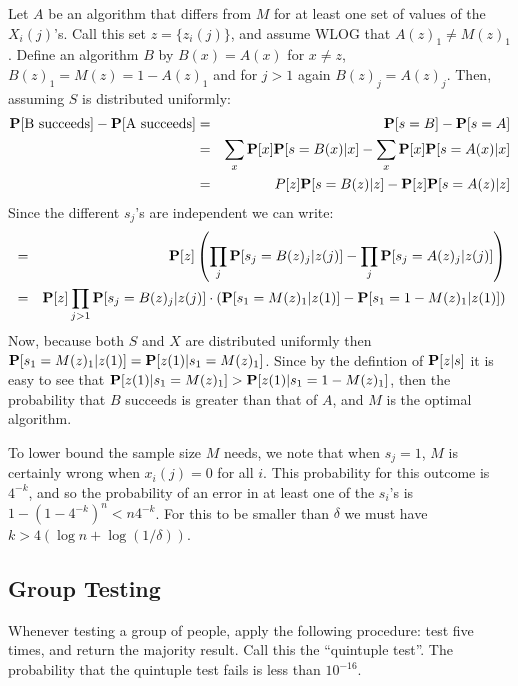 \documentclass[11pt]{article} \usepackage{amssymb}
\begin{document}
\begin{itemize}
Let $A$ be an algorithm that differs from $M$ for at least one set of values of
the $X_i(j)$'s. Call this set $z=\{z_i(j)\}$, and assume WLOG that $A(z)_1\neq M(z)_1$. 
Define an algorithm $B$ by 
$B(x)=A(x)$ for $x\neq z$,  $B(z)_1=M(z)=1- A(z)_1$ and for $j>1$ again 
$B(z)_j=A(z)_j$. Then, assuming $S$ is distributed uniformly:
\begin{eqnarray*}
\P[\mbox{B succeeds}]-\P[\mbox{A succeeds}] &=& 
\P[s=B]-\P[s=A] 
\\ &=& \sum_x\P[x]\P[s=B(x)|x]-\sum_x\P[x]\P[s=A(x)|x]
\\ &=& P[z]\P[s=B(z)|z]-\P[z]\P[s=A(z)|z]
\end{eqnarray*}
Since the different $s_j$'s are independent we can write:
\begin{eqnarray*}
 &=& \P[z]\left(\prod_j\P[s_j=B(z)_j|z(j)]-\prod_j\P[s_j=A(z)_j|z(j)]\right)
\\ &=& \P[z]\prod_{j>1}\P[s_j=B(z)_j|z(j)]\cdot\left(\P[s_1=M(z)_1|z(1)]-\P[s_1=1-M(z)_1|z(1)]\right)  
\end{eqnarray*}
Now, because both $S$ and $X$ are distributed uniformly then
 $\P[s_1=M(z)_1|z(1)]=\P[z(1)|s_1=M(z)_1]$. Since by the defintion of $\P[z|s]$ it
is easy to see that $\P[z(1)|s_1=M(z)_1]>\P[z(1)|s_1=1-M(z)_1]$, then
the probability that $B$ succeeds is greater than that of $A$, and $M$ is
the optimal algorithm.

To lower bound the sample size $M$ needs, we note that when $s_j=1$, $M$ 
is certainly wrong when $x_i(j)=0$ for all $i$.
This probability for this outcome is $4^{-k}$,
and so the probability of an
error in at least one of the $s_i$'s is 
$1-\left(1-4^{-k}\right)^n<n4^{-k}$. For this to be smaller than $\delta$ we must have
$k>4\left(\log n+\log(1/\delta)\right)$.
\end{itemize}

\subsection{Group Testing}
Whenever testing a group of people, apply the following procedure: test five
times,
and return the majority result. Call this the ``quintuple test''. The
probability that the quintuple test fails is less than $10^{-16}$.
\end{document}
